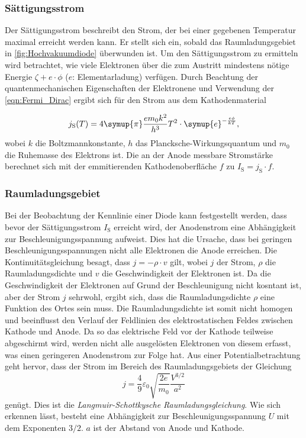 \subsubsection{Sättigungsstrom}
Der Sättigungsstrom beschreibt den Strom, der bei einer gegebenen Temperatur maximal erreicht werden kann. Er stellt sich ein, sobald das Raumladungsgebiet in \ref{fig:Hochvakuumdiode}
überwunden ist. Um den Sättigungsstrom zu ermitteln wird betrachtet, wie viele Elektronen über die zum Austritt mindestens nötige Energie 
$\zeta + e \cdot \phi$ ($e$: Elementarladung) verfügen. Durch Beachtung der quantenmechanischen Eigenschaften der Elektronene und Verwendung der \autoref{eqn:Fermi_Dirac} ergibt sich
für den Strom aus dem Kathodenmaterial

\begin{equation}
    \label{eqn:J_S}
    j_\text{S}(T) = 4 \symup{\pi}\frac{e m_0 k^2}{h^3}T^2 \cdot \symup{e}^{-\frac{e\phi}{kT}},
\end{equation}
wobei $k$ die Boltzmannkonstante, $h$ das Plancksche-Wirkungsquantum und $m_0$ die Ruhemasse des Elektrons ist. Die an der Anode messbare Stromstärke berechnet sich mit der 
emmitierenden Kathodenoberfläche $f$ zu $I_\text{S} = j_\text{S} \cdot f$.

\subsubsection{Raumladungsgebiet}
Bei der Beobachtung der Kennlinie einer Diode kann festgestellt werden, dass bevor der Sättigungsstrom $I_\text{S}$ erreicht wird, der Anodenstrom eine Abhängigkeit zur 
Beschleunigungsspannung aufweist. Dies hat die Ursache, dass bei geringen Beschleunigungsspannungen nicht alle Elektronen die Anode erreichen. Die Kontinuitätsgleichung
besagt, dass $j = -\rho \cdot v$ gilt, wobei $j$ der Strom, $\rho$ die Raumladungsdichte und $v$ die Geschwindigkeit der Elektronen ist. Da die Geschwindigkeit der Elektronen auf Grund
der Beschleunigung nicht kosntant ist, aber der Strom $j$ sehrwohl, ergibt sich, dass die Raumladungsdichte $\rho$ eine Funktion des Ortes sein muss.
Die Raumladungsdichte ist somit nicht homogen und beeinflusst den Verlauf der Feldlinien des elektrostatischen Feldes zwischen Kathode und Anode. 
Da so das elektrische Feld vor der Kathode teilweise abgeschirmt wird, werden nicht alle ausgelösten Elektronen von diesem erfasst, was einen geringeren Anodenstrom zur Folge hat.
Aus einer Potentialbetrachtung geht hervor, dass der Strom im Bereich des Raumladungsgebiets der Gleichung
\begin{equation}
    \label{eqn:Raumladung}
    j = \frac{4}{9}\varepsilon_0 \sqrt{\frac{2e}{m_0}}\frac{V^{3/2}}{a^2}
\end{equation}
genügt. Dies ist die \textit{Langmuir-Schottkysche Raumladungsgleichung}. 
Wie sich erkennen lässt, besteht eine Abhängigkeit zur Beschleunigungsspannung $U$ mit dem Exponenten $3/2$. $a$ ist der Abstand von Anode und Kathode.

